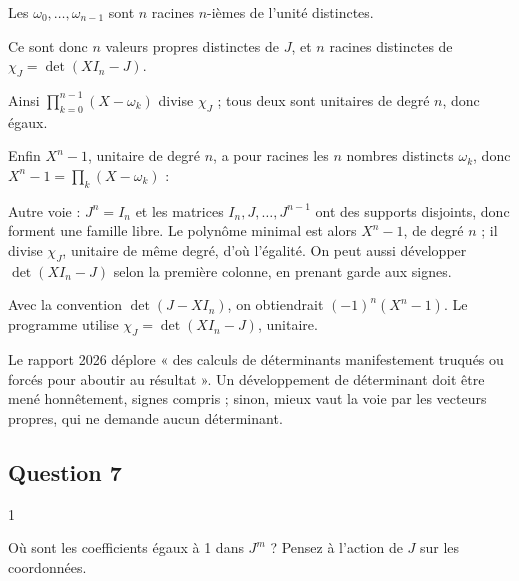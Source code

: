 \documentclass[11pt,a4paper]{article}
\newcommand{\equationajustee}[1]{%
  \sbox{\boiteequation}{$\displaystyle #1$}%
  \ifdim\wd\boiteequation>\linewidth
    \[\resizebox{\linewidth}{!}{\usebox{\boiteequation}}\]%
  \else
    \[#1\]%
  \fi}
\begin{document}
Les \(\omega_0,\dots,\omega_{n-1}\) sont \(n\) racines \(n\)-ièmes de l'unité distinctes.

Ce sont donc \(n\) valeurs propres distinctes de \(J\), et \(n\) racines distinctes de \(\chi_J=\det(XI_n-J)\).

Ainsi \(\prod_{k=0}^{n-1}(X-\omega_k)\) divise \(\chi_J\) ; tous deux sont unitaires de degré \(n\), donc égaux.

Enfin \(X^n-1\), unitaire de degré \(n\), a pour racines les \(n\) nombres distincts \(\omega_k\), donc \(X^n-1=\prod_{k}(X-\omega_k)\) :
\equationajustee{\boxed{\chi_J=X^n-1.}}

\begin{methode}

Autre voie : \(J^n=I_n\) et les matrices \(I_n,J,\dots,J^{n-1}\) ont des supports disjoints, donc forment une famille libre. Le polynôme minimal est alors \(X^n-1\), de degré \(n\) ; il divise \(\chi_J\), unitaire de même degré, d'où l'égalité. On peut aussi développer \(\det(XI_n-J)\) selon la première colonne, en prenant garde aux signes.

\end{methode}

\begin{piege}

Avec la convention \(\det(J-XI_n)\), on obtiendrait \((-1)^n(X^n-1)\). Le programme utilise \(\chi_J=\det(XI_n-J)\), unitaire.

\end{piege}

\begin{jury}

Le rapport 2026 déplore « des calculs de déterminants manifestement truqués ou forcés pour aboutir au résultat ». Un développement de déterminant doit être mené honnêtement, signes compris ; sinon, mieux vaut la voie par les vecteurs propres, qui ne demande aucun déterminant.

\end{jury}

\hypertarget{question-7}{%
\subsection{Question 7}\label{question-7}}

\begin{indication}{1}

Où sont les coefficients égaux à 1 dans \(J^m\) ? Pensez à l'action de \(J\) sur les coordonnées.

\end{indication}
\end{document}
